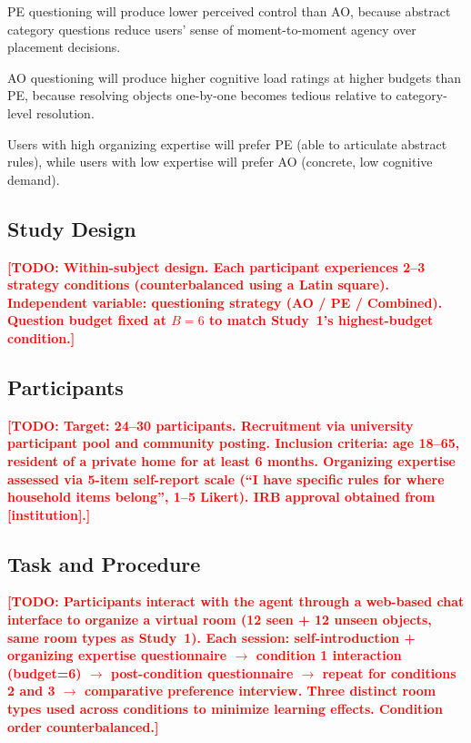 \documentclass[a4paper,fleqn]{cas-sc}
\newcommand{\TODO}[1]{\textcolor{red}{\textbf{[TODO: #1]}}}
\begin{document}
\begin{description}[leftmargin=*]
    \item[\textbf{H6}] PE questioning will produce lower perceived control than AO, because abstract category questions reduce users' sense of moment-to-moment agency over placement decisions.
    \item[\textbf{H7}] AO questioning will produce higher cognitive load ratings at higher budgets than PE, because resolving objects one-by-one becomes tedious relative to category-level resolution.
    \item[\textbf{H8}] Users with high organizing expertise will prefer PE (able to articulate abstract rules), while users with low expertise will prefer AO (concrete, low cognitive demand).
\end{description}

\subsection{Study Design}

\TODO{Within-subject design. Each participant experiences 2--3 strategy conditions (counterbalanced using a Latin square). Independent variable: questioning strategy (AO / PE / Combined). Question budget fixed at $B=6$ to match Study~1's highest-budget condition.}

\subsection{Participants}

\TODO{Target: 24--30 participants. Recruitment via university participant pool and community posting. Inclusion criteria: age 18--65, resident of a private home for at least 6 months. Organizing expertise assessed via 5-item self-report scale (``I have specific rules for where household items belong'', 1--5 Likert). IRB approval obtained from [institution].}

\subsection{Task and Procedure}

\TODO{Participants interact with the agent through a web-based chat interface to organize a virtual room (12 seen + 12 unseen objects, same room types as Study~1). Each session: self-introduction + organizing expertise questionnaire $\to$ condition 1 interaction (budget=6) $\to$ post-condition questionnaire $\to$ repeat for conditions 2 and 3 $\to$ comparative preference interview. Three distinct room types used across conditions to minimize learning effects. Condition order counterbalanced.}
\end{document}
